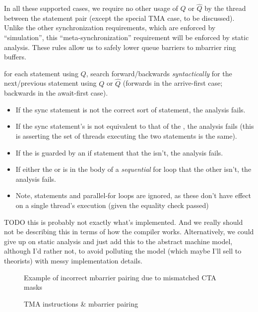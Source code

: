 \filbreak
In all these supported cases, we require no other usage of $Q$ or $\widehat{Q}$ by the thread between the statement pair (except the special TMA case, to be discussed).
Unlike the other synchronization requirements, which are enforced by ``simulation'', this ``meta-synchronization'' requirement will be enforced by static analysis.
These rules allow us to safely lower queue barriers to mbarrier ring buffers.

 for each  statement using $Q$, search forward/backwards \textit{syntactically} for the next/previous statement using $Q$ or $\widehat{Q}$ (forwards in the arrive-first case; backwards in the await-first case).
\filbreak
\begin{itemize}
  \item If the sync statement is not the correct sort of  statement, the analysis fails.
  \filbreak
  \item If the sync statement's  is not equivalent to that of the , the analysis fails (this is asserting the set of threads executing the two statements is the same).
  \filbreak
  \item If the  is guarded by an if statement that the  isn't, the analysis fails.
  \filbreak
  \item If either the  or  is in the body of a \textit{sequential} for loop that the other isn't, the analysis fails.
  \filbreak
  \item Note,  statements and parallel-for loops are ignored, as these don't have effect on a single thread's execution (given the  equality check passed)
\end{itemize}

TODO this is probably not exactly what's implemented.
And we really should not be describing this in terms of how the compiler works.
Alternatively, we could give up on static analysis and just add this to the abstract machine model, although I'd rather not, to avoid polluting the model (which maybe I'll sell to theorists) with messy implementation details.

\begin{figure}[!b]

\caption{Example of incorrect mbarrier pairing due to mismatched CTA masks} \label{fig:multicast_pairing_fail}
\end{figure}

\begin{figure}[!b]

\caption{TMA instructions \& mbarrier pairing} \label{fig:tma_pairing_multicast}
\end{figure}

